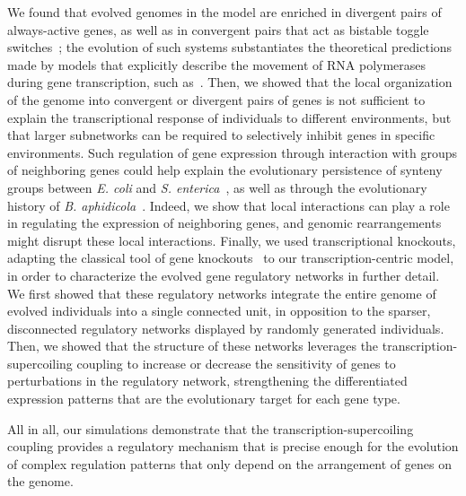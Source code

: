 We found that evolved genomes in the model are enriched in divergent pairs of always-active genes, as well as in convergent pairs that act as bistable toggle switches~\citep{gardner2000,johnstone2022}; the evolution of such systems substantiates the theoretical predictions made by models that explicitly describe the movement of RNA polymerases during gene transcription, such as~\cite{sevier2021}.
Then, we showed that the local organization of the genome into convergent or divergent pairs of genes is not sufficient to explain the transcriptional response of individuals to different environments, but that larger subnetworks can be required to selectively inhibit genes in specific environments.
Such regulation of gene expression through interaction with groups of neighboring genes could help explain the evolutionary persistence of synteny groups between \emph{E. coli} and \emph{S. enterica}~\citep{junier2016}, as well as through the evolutionary history of \emph{B. aphidicola}~\citep{brinza2013}.
Indeed, we show that local interactions can play a role in regulating the expression of neighboring genes, and genomic rearrangements might disrupt these local interactions.
Finally, we used transcriptional knockouts, adapting the  classical tool of gene knockouts~\citep{baba2006} to our transcription-centric model, in order to characterize the evolved gene regulatory networks in further detail.
We first showed that these regulatory networks integrate the entire genome of evolved individuals into a single connected unit, in opposition to the sparser, disconnected regulatory networks displayed by randomly generated individuals.
Then, we showed that the structure of these networks leverages the transcription-supercoiling coupling to increase or decrease the sensitivity of genes to perturbations in the regulatory network, strengthening the differentiated expression patterns that are the evolutionary target for each gene type.

All in all, our simulations demonstrate that the transcription-supercoiling coupling provides a regulatory mechanism that is precise enough for the evolution of complex regulation patterns that only depend on the arrangement of genes on the genome.

